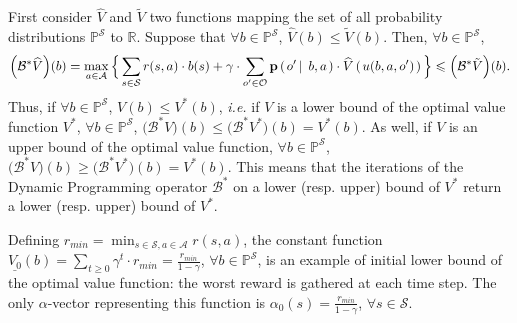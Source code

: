 First consider $\widehat{V}$ and $\tilde{V}$
two functions mapping the set of all probability distributions 
$\mathbb{P}^{\mathcal{S}}$ to $\mathbb{R}$.
Suppose that $\forall b \in \mathbb{P}^{\mathcal{S}}$, 
$\widehat{V}(b) \leqslant \tilde{V}(b)$.
Then, $\forall b \in \mathbb{P}^{\mathcal{S}}$, 
\[ \Big(\mathcal{B}^* \widehat{V} \Big) (b) = \max_{a \in \mathcal{A}} \Big\{ \sum_{s \in \mathcal{S}} r(s,a) \cdot b(s) + \gamma \cdot \sum_{o' \in \mathcal{O}} \textbf{p} \left( \left. o' \, \right| \left. \, b , a  \right. \right) \cdot \widehat{V} \left( \left.  u(b,a,o')   \right. \right) \Big\} \leqslant \Big( \mathcal{B}^* \tilde{V} \Big)(b) . \]
Thus, if $\forall b \in \mathbb{P}^{\mathcal{S}}$, $V(b) \leqslant V^*(b)$,
\textit{i.e.} if $V$ is a lower bound of the optimal value function $V^*$,
$\forall b \in \mathbb{P}^{\mathcal{S}}$,
$\Big( \mathcal{B}^* V \Big) (b) \leqslant \Big( \mathcal{B}^* V^* \Big) (b) = V^*(b)$.
As well, if $V$ is an upper bound of the optimal value function,
$\forall b \in \mathbb{P}^{\mathcal{S}}$,
$\Big( \mathcal{B}^* V \Big) (b) \geqslant \Big( \mathcal{B}^* V^* \Big) (b) = V^*(b)$.
This means that the iterations of the Dynamic Programming operator $\mathcal{B}^*$
on a lower (resp. upper) bound of $V^*$ return a lower (resp. upper)
bound of $V^*$.

Defining $r_{min} = \min_{s \in \mathcal{S}, a \in \mathcal{A}} r(s,a)$, 
the constant function $\underline{V_0}(b) = \sum_{t \geqslant 0} \gamma^t \cdot r_{min} = \frac{r_{min}}{1 - \gamma }$,
$\forall b \in \mathbb{P}^{\mathcal{S}}$,
is an example of initial lower bound 
of the optimal value function:
the worst reward is gathered at each time step.
The only $\alpha$-vector
representing this function is 
$\alpha_0(s) = \frac{r_{min}}{1 - \gamma }$, $\forall s \in \mathcal{S}$.

